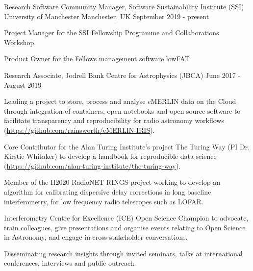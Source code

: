 \begin{cventries}
  \cventry
    {Research Software Community Manager, Software Sustainability Institute (SSI)}
    {University of Manchester}
    {Manchester, UK}
    {September 2019 - present}
    {
      \begin{cvitems}
        \item {Project Manager for the SSI Fellowship Programme and Collaborations Workshop.}
        \item{Product Owner for the Fellows management software lowFAT}
      \end{cvitems}
    }\vspace{-15pt}

  \cventry
    {Research Associate, Jodrell Bank Centre for Astrophysics (JBCA)}
    {}
    {}
    {June 2017 - August 2019}
    {
      \begin{cvitems}
        \item {Leading a project to store, process and analyse $e$MERLIN data on the Cloud through integration of containers, open notebooks and open source software to facilitate transparency and reproducibility for radio astronomy workflows (\url{https://github.com/rainsworth/eMERLIN-IRIS}).}
        \item {Core Contributor for the Alan Turing Institute's project The Turing Way (PI Dr. Kirstie Whitaker) to develop a handbook for reproducible data science (\url{https://github.com/alan-turing-institute/the-turing-way}).}
        \item {Member of the H2020 RadioNET RINGS project working to develop an algorithm for calibrating dispersive delay corrections in long baseline interferometry, for low frequency radio telescopes such as LOFAR.}
        \item {Interferometry Centre for Excellence (ICE) Open Science Champion to advocate, train colleagues, give presentations and organise events relating to Open Science in Astronomy, and engage in cross-stakeholder conversations.}
        \item {Disseminating research insights through invited seminars, talks at international conferences, interviews and public outreach.}
      \end{cvitems}
    }\vspace{-6pt}


\end{cventries}
